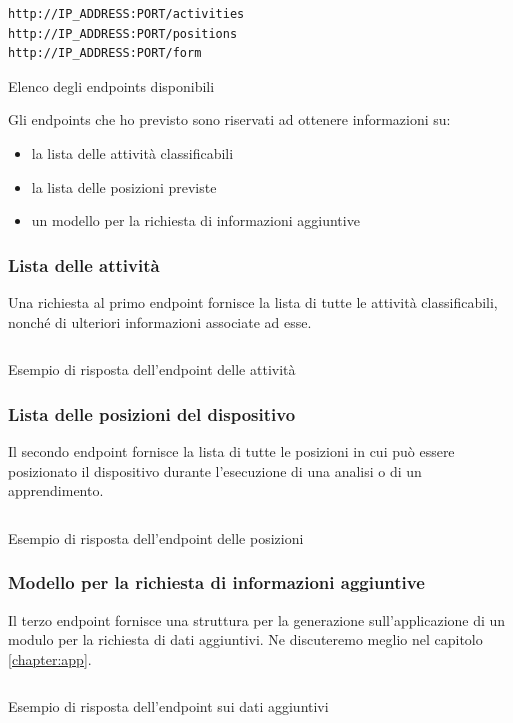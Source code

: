 \begin{listing}[H] 
    \begin{verbatim}
http://IP_ADDRESS:PORT/activities
http://IP_ADDRESS:PORT/positions
http://IP_ADDRESS:PORT/form
    \end{verbatim}
    \caption{Elenco degli endpoints disponibili}
    \label{listing:endpoint-positions}
\end{listing}

\noindent Gli endpoints che ho previsto sono riservati ad ottenere informazioni su:
\begin{itemize}
    \item la lista delle attività classificabili
    \item la lista delle posizioni previste
    \item un modello per la richiesta di informazioni aggiuntive
\end{itemize}


\newpage
\subsubsection{Lista delle attività}
Una richiesta al primo endpoint fornisce la lista di tutte le attività classificabili, nonché di ulteriori informazioni associate ad esse.
\vfill
\begin{listing}[H] 
    \inputminted[frame=single,framesep=10pt]{json}{assets/snippets/server/api/activities.json}
    \caption{Esempio di risposta dell'endpoint delle attività}
    \label{listing:response-activities}
\end{listing}

\newpage
\subsubsection{Lista delle posizioni del dispositivo}
Il secondo endpoint fornisce la lista di tutte le posizioni in cui può essere posizionato il dispositivo durante l'esecuzione 
di una analisi o di un apprendimento.
\vfill
\begin{listing}[H] 
    \inputminted[frame=single,framesep=10pt]{json}{assets/snippets/server/api/positions.json}
    \caption{Esempio di risposta dell'endpoint delle posizioni}
    \label{listing:response-positions}
\end{listing}

\newpage
\subsubsection{Modello per la richiesta di informazioni aggiuntive}
Il terzo endpoint fornisce una struttura per la generazione sull'applicazione di un modulo per la richiesta di dati aggiuntivi. 
Ne discuteremo meglio nel capitolo \ref{chapter:app}.
\vfill
\begin{listing}[H] 
    \inputminted[frame=single,framesep=10pt]{json}{assets/snippets/server/api/form.json}
    \caption{Esempio di risposta dell'endpoint sui dati aggiuntivi}
    \label{listing:response-form}
\end{listing}

